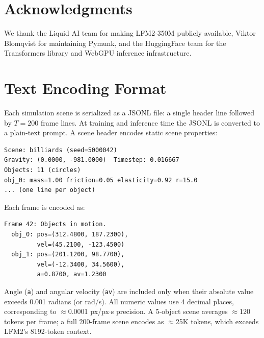 \documentclass{article}
\begin{document}
\section*{Acknowledgments}
We thank the Liquid AI team for making LFM2-350M publicly available, Viktor
Blomqvist for maintaining Pymunk, and the HuggingFace team for the Transformers
library and WebGPU inference infrastructure.




\appendix

\section{Text Encoding Format}
\label{app:format}

Each simulation scene is serialized as a JSONL file: a single header line followed
by $T=200$ frame lines. At training and inference time the JSONL is converted to
a plain-text prompt. A scene header encodes static scene properties:

\begin{small}
\begin{verbatim}
Scene: billiards (seed=5000042)
Gravity: (0.0000, -981.0000)  Timestep: 0.016667
Objects: 11 (circles)
obj_0: mass=1.00 friction=0.05 elasticity=0.92 r=15.0
... (one line per object)
\end{verbatim}
\end{small}

\noindent Each frame is encoded as:

\begin{small}
\begin{verbatim}
Frame 42: Objects in motion.
  obj_0: pos=(312.4800, 187.2300),
         vel=(45.2100, -123.4500)
  obj_1: pos=(201.1200, 98.7700),
         vel=(-12.3400, 34.5600),
         a=0.8700, av=1.2300
\end{verbatim}
\end{small}

\noindent Angle (\texttt{a}) and angular velocity (\texttt{av}) are included only
when their absolute value exceeds 0.001 radians (or rad/s). All numeric values use
4 decimal places, corresponding to $\approx$0.0001 px/px$\cdot$s precision.
A 5-object scene averages $\approx$120 tokens per frame; a full 200-frame scene
encodes as $\approx$25K tokens, which exceeds LFM2's 8192-token context.
\end{document}
